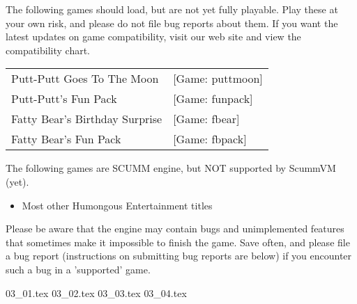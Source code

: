 \begin{itemize}
  The following games should load, but are not yet fully playable. Play these at your own risk, and please do not file bug reports about them. If you want
the latest updates on game compatibility, visit our web site and view the
compatibility chart.

\begin{tabular}{ll}
  Putt-Putt Goes To The Moon&                    [Game: puttmoon]\\
  Putt-Putt's Fun Pack&                          [Game: funpack]\\
  Fatty Bear's Birthday Surprise&                [Game: fbear]\\
  Fatty Bear's Fun Pack&                         [Game: fbpack]\\
\end{tabular}

  The following games are SCUMM engine, but NOT supported by ScummVM (yet).
  \begin{itemize}
  \item Most other Humongous Entertainment titles
  \end{itemize}
%
Please be aware that the engine may contain bugs and unimplemented features
that sometimes make it impossible to finish the game. Save often, and please
file a bug report (instructions on submitting bug reports are below) if you
encounter such a bug in a 'supported' game.
\end{itemize}
 {03_01.tex}
 {03_02.tex}
 {03_03.tex}
 {03_04.tex}


